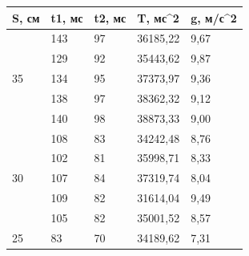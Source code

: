 \documentclass[a4paper,12pt]{article}
\begin{document}
\begin{center}
    
\begin{tabular}{|l|l|l|l|l|}
\hline
S, см &t1, мс & t2, мс & T, мс^2 & g, м/с^2\\ \hline
\multirow{5}{*}{35}       & 143                        & 97                         & 36185,22                                     & 9,67                                          \\
                          & 129                        & 92                         & 35443,62                                     & 9,87                                          \\
                          & 134                        & 95                         & 37373,97                                     & 9,36                                          \\
                          & 138                        & 97                         & 38362,32                                     & 9,12                                          \\
                          & 140                        & 98                         & 38873,33                                     & 9,00                                          \\ \hline
\multirow{5}{*}{30}       & 108                        & 83                         & 34242,48                                     & 8,76                                          \\
                          & 102                        & 81                         & 35998,71                                     & 8,33                                          \\
                          & 107                        & 84                         & 37319,74                                     & 8,04                                          \\
                          & 109                        & 82                         & 31614,04                                     & 9,49                                          \\
                          & 105                        & 82                         & 35001,52                                     & 8,57                                          \\ \hline
\multirow{5}{*}{25}       & 83                         & 70                         & 34189,62                                     & 7,31                                          \\

\end{tabular}
\end{center}
\end{document}
